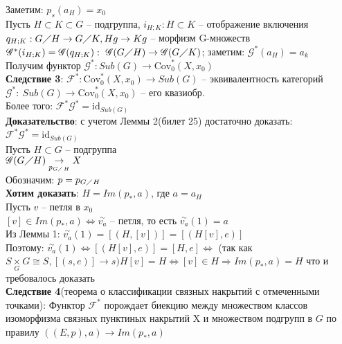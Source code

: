 	Заметим: $p_s (a_H) = x_0$\\
	Пусть $H\subset K \subset G$ -- подгруппа, $i_{H;K}: H \subset K$ -- отображение включения\\
	$q_{H;K}: G\diagup H \rightarrow G\diagup K, Hg \rightarrow Kg$ -- морфизм G-множеств\\
	$\mathscr{G}^* (i_{H;K}) = \mathscr{G}(q_{H;K}):\ \mathscr{G}(G\diagup H) \rightarrow \mathscr{G} (G\diagup K)$; заметим: $\mathscr{G}^* (a_H) = a_k$\\
	Получим функтор $\mathscr{G}^*: Sub(G)\rightarrow \text{Cov}_0^* (X,x_0)$\\
	\textbf{Следствие 3}: $\mathcal{F}^*: \text{Cov}_0^* (X,x_0) \rightarrow Sub(G)$ -- эквивалентность категорий\\
	$\mathscr{G}^*:\ Sub(G) \rightarrow \text{Cov}_0^* (X,x_0)$ -- его квазиобр.\\
	Более того: $\mathcal{F}^* \mathscr{G}^* =  \text{id}_{Sub(G)}$\\
	\textbf{Доказательство}: с учетом Леммы 2(билет 25) достаточно доказать: $\mathcal{F}^* \mathscr{G}^* =  \text{id}_{Sub(G)}$\\
	Пусть $H\subset G$ -- подгруппа\\
	$\mathscr{G} (G\diagup H) \underset{p_{G\diagup H}}{\rightarrow} X$\\
	Обозначим: $p = p_{G\diagup H}$\\
	\textbf{Хотим доказать}: $H = Im(p_{*},a)$, где $a = a_H$\\
	Пусть $v$ -- петля в $x_0$\\
	$[v] \in Im(p_{*},a) \Leftrightarrow \overset{\sim}{v_a}$ -- петля, то есть $\overset{\sim}{v_a} (1) = a$\\
	Из Леммы 1: $\overset{\sim}{v_a} (1) = [(H,[v])] = [(H[v],e)]$\\
	Поэтому: $\overset{\sim}{v_a} (1) \Leftrightarrow [(H[v],e)] = [H,e] \Leftrightarrow$ (так как $S \underset{G}{\times} G \cong S, [(s,e)]\rightarrow s) H[v] = H \Leftrightarrow [v]\in H \Rightarrow Im(p_{*},a) = H$ что и требовалось доказать\\
	\textbf{Следствие 4}(теорема о классификации связных накрытий с отмеченными точками): Функтор $\mathcal{F}^*$ порождает биекцию между множеством классов изоморфизма связных пунктиных накрытий X и множеством подгрупп в $G$ по правилу $((E,p),a) \rightarrow Im(p_{*},a)$\\
	\begin{figure}[h]
	\end{figure}\\